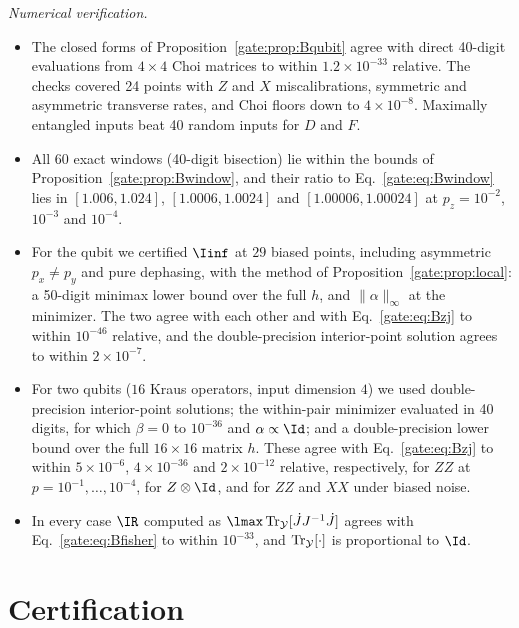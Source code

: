 \emph{Numerical verification.}
\begin{itemize}
\item The closed forms of Proposition~\ref{gate:prop:Bqubit} agree with direct 40-digit evaluations from $4\times4$ Choi matrices to within $1.2\times10^{-33}$ relative. The checks covered 24 points with $Z$ and $X$ miscalibrations, symmetric and asymmetric transverse rates, and Choi floors down to $4\times10^{-8}$. Maximally entangled inputs beat 40 random inputs for $D$ and $F$.
\item All $60$ exact windows (40-digit bisection) lie within the bounds of Proposition~\ref{gate:prop:Bwindow}, and their ratio to Eq.~\eqref{gate:eq:Bwindow} lies in $[1.006,1.024]$, $[1.0006,1.0024]$ and $[1.00006,1.00024]$ at $p_z=10^{-2}$, $10^{-3}$ and $10^{-4}$.
\item For the qubit we certified $\Iinf$ at $29$ biased points, including asymmetric $p_x\ne p_y$ and pure dephasing, with the method of Proposition~\ref{gate:prop:local}: a 50-digit minimax lower bound over the full $h$, and $\|\alpha\|_\infty$ at the minimizer. The two agree with each other and with Eq.~\eqref{gate:eq:Bzj} to within $10^{-46}$ relative, and the double-precision interior-point solution agrees to within $2\times10^{-7}$.
\item For two qubits ($16$ Kraus operators, input dimension $4$) we used double-precision interior-point solutions; the within-pair minimizer evaluated in 40 digits, for which $\beta=0$ to $10^{-36}$ and $\alpha\propto\Id$; and a double-precision lower bound over the full $16\times16$ matrix $h$. These agree with Eq.~\eqref{gate:eq:Bzj} to within $5\times10^{-6}$, $4\times10^{-36}$ and $2\times10^{-12}$ relative, respectively, for $ZZ$ at $p=10^{-1},\dots,10^{-4}$, for $Z\otimes\Id$, and for $ZZ$ and $XX$ under biased noise.
\item In every case $\IR$ computed as $\lmax\Tr_{\mathcal Y}[\dot JJ^{-1}\dot J]$ agrees with Eq.~\eqref{gate:eq:Bfisher} to within $10^{-33}$, and $\operatorname{Tr}_{\mathcal Y}[\cdot]$ is proportional to $\Id$.
\end{itemize}

\section{Certification}\label{gate:sec:cert-proofs}

